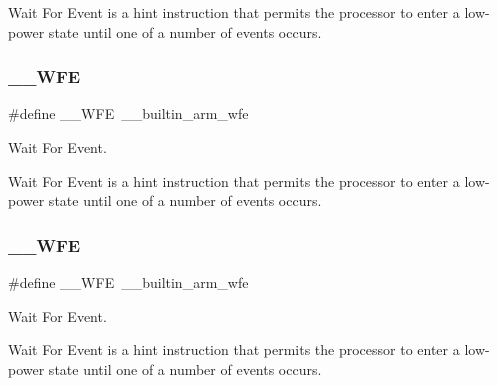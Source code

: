 Wait For Event is a hint instruction that permits the processor to enter a low-\/power state until one of a number of events occurs. \mbox{\label{group___c_m_s_i_s___core___instruction_interface_gaac6cc7dd4325d9cb40d3290fa5244b3d}} 
\subsubsection{\texorpdfstring{\_\_WFE}{\_\_WFE}\hspace{0.1cm}{\footnotesize\ttfamily [2/4]}}
{\footnotesize\ttfamily \#define \+\_\+\+\_\+\+W\+FE~\+\_\+\+\_\+builtin\+\_\+arm\+\_\+wfe}



Wait For Event. 

Wait For Event is a hint instruction that permits the processor to enter a low-\/power state until one of a number of events occurs. \mbox{\label{group___c_m_s_i_s___core___instruction_interface_gaac6cc7dd4325d9cb40d3290fa5244b3d}} 
\subsubsection{\texorpdfstring{\_\_WFE}{\_\_WFE}\hspace{0.1cm}{\footnotesize\ttfamily [3/4]}}
{\footnotesize\ttfamily \#define \+\_\+\+\_\+\+W\+FE~\+\_\+\+\_\+builtin\+\_\+arm\+\_\+wfe}



Wait For Event. 

Wait For Event is a hint instruction that permits the processor to enter a low-\/power state until one of a number of events occurs. \mbox{\label{group___c_m_s_i_s___core___instruction_interface_gaf0330712223f4cfb6091e4ab84775f73}} 
